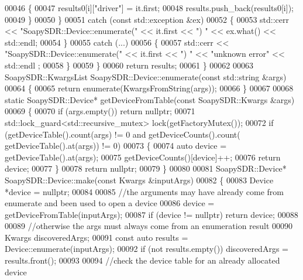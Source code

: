 \begin{DoxyCode}
00046             \{
00047                 results0[i][\textcolor{stringliteral}{"driver"}] = it.first;
00048                 results.push\_back(results0[i]);
00049             \}
00050         \}
00051         \textcolor{keywordflow}{catch} (\textcolor{keyword}{const} std::exception &ex)
00052         \{
00053             std::cerr << \textcolor{stringliteral}{"SoapySDR::Device::enumerate("} << it.first << \textcolor{stringliteral}{") "} << ex.what() << std::endl;
00054         \}
00055         \textcolor{keywordflow}{catch} (...)
00056         \{
00057             std::cerr << \textcolor{stringliteral}{"SoapySDR::Device::enumerate("} << it.first << \textcolor{stringliteral}{") "} << \textcolor{stringliteral}{"unknown error"} << std::endl
      ;
00058         \}
00059     \}
00060     \textcolor{keywordflow}{return} results;
00061 \}
00062 
00063 SoapySDR::KwargsList SoapySDR::Device::enumerate(\textcolor{keyword}{const} std::string &args)
00064 \{
00065     \textcolor{keywordflow}{return} enumerate(KwargsFromString(args));
00066 \}
00067 
00068 \textcolor{keyword}{static} SoapySDR::Device* getDeviceFromTable(\textcolor{keyword}{const} SoapySDR::Kwargs &args)
00069 \{
00070     \textcolor{keywordflow}{if} (args.empty()) \textcolor{keywordflow}{return} \textcolor{keyword}{nullptr};
00071     std::lock\_guard<std::recursive\_mutex> lock(getFactoryMutex());
00072     \textcolor{keywordflow}{if} (getDeviceTable().count(args) != 0 and getDeviceCounts().count(
      getDeviceTable().at(args)) != 0)
00073     \{
00074         \textcolor{keyword}{auto} device = getDeviceTable().at(args);
00075         getDeviceCounts()[device]++;
00076         \textcolor{keywordflow}{return} device;
00077     \}
00078     \textcolor{keywordflow}{return} \textcolor{keyword}{nullptr};
00079 \}
00080 
00081 SoapySDR::Device* SoapySDR::Device::make(\textcolor{keyword}{const} Kwargs &inputArgs)
00082 \{
00083     Device *device = \textcolor{keyword}{nullptr};
00084 
00085     \textcolor{comment}{//the arguments may have already come from enumerate and been used to open a device}
00086     device = getDeviceFromTable(inputArgs);
00087     \textcolor{keywordflow}{if} (device != \textcolor{keyword}{nullptr}) \textcolor{keywordflow}{return} device;
00088 
00089     \textcolor{comment}{//otherwise the args must always come from an enumeration result}
00090     Kwargs discoveredArgs;
00091     \textcolor{keyword}{const} \textcolor{keyword}{auto} results = Device::enumerate(inputArgs);
00092     \textcolor{keywordflow}{if} (not results.empty()) discoveredArgs = results.front();
00093 
00094     \textcolor{comment}{//check the device table for an already allocated device}

\end{DoxyCode}
